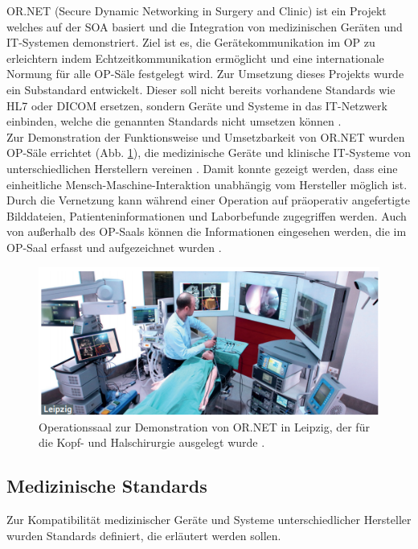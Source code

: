 OR.NET (Secure Dynamic Networking in Surgery and Clinic) ist ein Projekt welches auf der SOA basiert und die Integration von medizinischen Geräten und IT-Systemen demonstriert. Ziel ist es, die Gerätekommunikation im OP zu erleichtern indem  Echtzeitkommunikation ermöglicht und eine internationale Normung für alle OP-Säle festgelegt wird. Zur Umsetzung dieses Projekts wurde ein Substandard entwickelt. Dieser soll nicht bereits vorhandene Standards wie HL7 oder DICOM ersetzen, sondern Geräte und Systeme in das IT-Netzwerk einbinden, welche die genannten Standards nicht umsetzen können \cite{ORnetWebsite}.\\
Zur Demonstration der Funktionsweise und Umsetzbarkeit von OR.NET wurden OP-Säle errichtet (Abb. \ref{fig:ornet}), die medizinische Geräte und klinische IT-Systeme von unterschiedlichen Herstellern vereinen \cite{ORnet}. Damit konnte gezeigt werden, dass eine einheitliche Mensch-Maschine-Interaktion unabhängig vom Hersteller möglich ist. Durch die Vernetzung kann während einer Operation auf präoperativ angefertigte Bilddateien, Patienteninformationen und Laborbefunde zugegriffen werden. Auch von außerhalb des OP-Saals können die Informationen eingesehen werden, die im OP-Saal erfasst und aufgezeichnet wurden \cite{ORnetWebsite}.

\begin{figure} [t!]
	\includegraphics[scale = 0.8]{Content/Pictures/ornet.png}
	\caption{Operationssaal zur Demonstration von OR.NET in Leipzig, der für die Kopf- und Halschirurgie ausgelegt wurde \cite{ORnetWebsite}.}
	\label{fig:ornet}
\end{figure}

\subsection{Medizinische Standards}

Zur Kompatibilität medizinischer Geräte und Systeme unterschiedlicher Hersteller wurden Standards definiert, die erläutert werden sollen.

